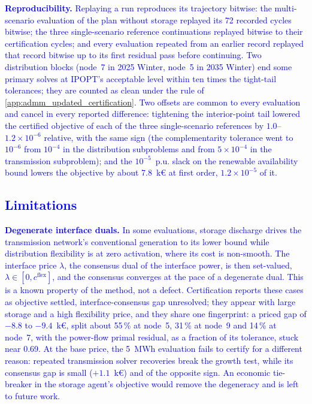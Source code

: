 \documentclass[preprint,12pt]{elsarticle}
\begin{document}
\textcolor{blue}{
    \textbf{Reproducibility.} Replaying a run reproduces its trajectory bitwise: the multi-scenario evaluation of the plan without storage replayed its 72 recorded cycles bitwise; the three single-scenario reference continuations replayed bitwise to their certification cycles; and every evaluation repeated from an earlier record replayed that record bitwise up to its first residual pass before continuing. Two distribution blocks (node~7 in 2025 Winter, node~5 in 2035 Winter) end some primary solves at IPOPT's acceptable level within ten times the tight-tail tolerances; they are counted as clean under the rule of \ref{app:admm_updated_certification}. Two offsets are common to every evaluation and cancel in every reported difference: tightening the interior-point tail lowered the certified objective of each of the three single-scenario references by $1.0$--$1.2 \times 10^{-6}$ relative, with the same sign (the complementarity tolerance went to $10^{-6}$ from $10^{-4}$ in the distribution subproblems and from $5 \times 10^{-4}$ in the transmission subproblem); and the $10^{-5}$~p.u. slack on the renewable availability bound lowers the objective by about 7.8~k\euro{} at first order, $1.2 \times 10^{-5}$ of it.
}

\subsection{\textcolor{blue}{Limitations}}
\label{subsec:res_limitations}

\textcolor{blue}{
    \textbf{Degenerate interface duals.} In some evaluations, storage discharge drives the transmission network's conventional generation to its lower bound while distribution flexibility is at zero activation, where its cost is non-smooth. The interface price $\lambda$, the consensus dual of the interface power, is then set-valued, $\lambda \in [0, c^{\text{flex}}]$, and the consensus converges at the pace of a degenerate dual. This is a known property of the method, not a defect. Certification reports these cases as objective settled, interface-consensus gap unresolved; they appear with large storage and a high flexibility price, and they share one fingerprint: a priced gap of $-8.8$ to $-9.4$~k\euro, split about 55\,\% at node~5, 31\,\% at node~9 and 14\,\% at node~7, with the power-flow primal residual, as a fraction of its tolerance, stuck near 0.69. At the base price, the 5~MWh evaluation fails to certify for a different reason: repeated transmission solver recoveries break the growth test, while its consensus gap is small ($+1.1$~k\euro) and of the opposite sign. An economic tie-breaker in the storage agent's objective would remove the degeneracy and is left to future work.
}
\end{document}
